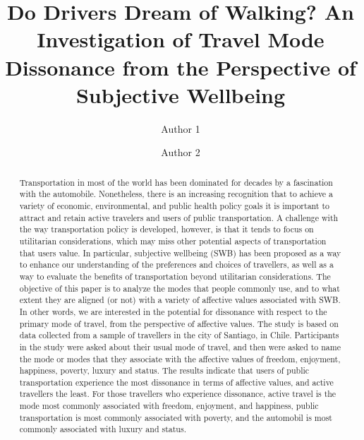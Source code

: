 \documentclass[]{elsarticle} %
\begin{document}
\begin{frontmatter}

  \title{Do Drivers Dream of Walking? An Investigation of Travel Mode Dissonance
from the Perspective of Subjective Wellbeing}
    \author[Some University]{Author 1}
    \author[Some School]{Author 2}
  
      \address[Some University]{Department, Street, City, State, Zip}
    \address[Some School]{Department, Street, City, State, Zip}
  
  \begin{abstract}
  Transportation in most of the world has been dominated for decades by a
  fascination with the automobile. Nonetheless, there is an increasing
  recognition that to achieve a variety of economic, environmental, and
  public health policy goals it is important to attract and retain active
  travelers and users of public transportation. A challenge with the way
  transportation policy is developed, however, is that it tends to focus
  on utilitarian considerations, which may miss other potential aspects of
  transportation that users value. In particular, subjective wellbeing
  (SWB) has been proposed as a way to enhance our understanding of the
  preferences and choices of travellers, as well as a way to evaluate the
  benefits of transportation beyond utilitarian considerations. The
  objective of this paper is to analyze the modes that people commonly
  use, and to what extent they are aligned (or not) with a variety of
  affective values associated with SWB. In other words, we are interested
  in the potential for dissonance with respect to the primary mode of
  travel, from the perspective of affective values. The study is based on
  data collected from a sample of travellers in the city of Santiago, in
  Chile. Participants in the study were asked about their usual mode of
  travel, and then were asked to name the mode or modes that they
  associate with the affective values of freedom, enjoyment, happiness,
  poverty, luxury and status. The results indicate that users of public
  transportation experience the most dissonance in terms of affective
  values, and active travellers the least. For those travellers who
  experience dissonance, active travel is the mode most commonly
  associated with freedom, enjoyment, and happiness, public transportation
  is most commonly associated with poverty, and the automobil is most
  commonly associated with luxury and status.
  \end{abstract}
  
 \end{frontmatter}
\end{document}
